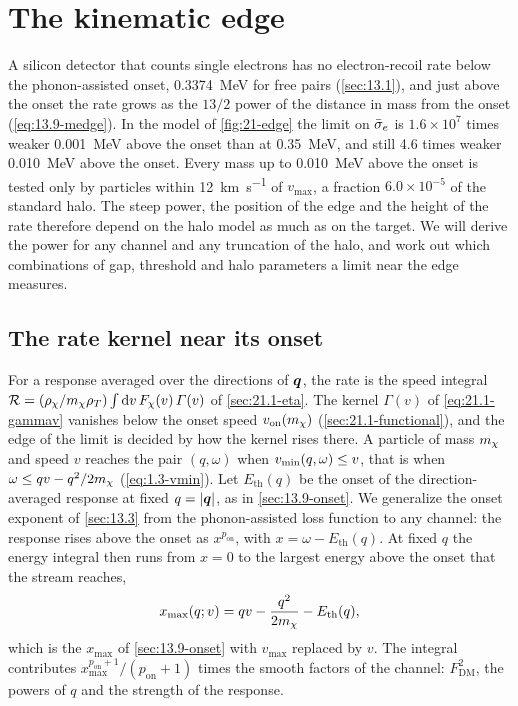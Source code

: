 \section{The kinematic edge}\label{sec:21.3}

A silicon detector that counts single electrons has no electron-recoil rate below the phonon-assisted onset, \SI{0.3374}{MeV} for free pairs (\cref{sec:13.1}), and just above the onset the rate grows as the $13/2$ power of the distance in mass from the onset (\cref{eq:13.9-medge}). In the model of \cref{fig:21-edge} the limit on $\bar{\sigma}_{e}$ is $1.6\times10^7$ times weaker \SI{0.001}{MeV} above the onset than at \SI{0.35}{MeV}, and still 4.6 times weaker \SI{0.010}{MeV} above the onset. Every mass up to \SI{0.010}{MeV} above the onset is tested only by particles within \SI{12}{km.s^{-1}} of $v_{\mathrm{max}}$, a fraction $6.0\times10^{-5}$ of the standard halo. The steep power, the position of the edge and the height of the rate therefore depend on the halo model as much as on the target. We will derive the power for any channel and any truncation of the halo, and work out which combinations of gap, threshold and halo parameters a limit near the edge measures.

\subsection{The rate kernel near its onset}\label{sec:21.3-kernel}

For a response averaged over the directions of $\bm{q}$, the rate is the speed integral $\mathcal{R} = (\rho_\chi/m_{\chi}\rho_T)\int\mathrm{d} v\, F_\chi(v)\,\varGamma(v)$ of \cref{sec:21.1-eta}. The kernel $\varGamma(v)$ of \cref{eq:21.1-gammav} vanishes below the onset speed $v_{\mathrm{on}}(m_{\chi})$ (\cref{sec:21.1-functional}), and the edge of the limit is decided by how the kernel rises there. A particle of mass $m_{\chi}$ and speed $v$ reaches the pair $(q,\omega)$ when $v_{\mathrm{min}}(q,\omega) \le v$, that is when $\omega \le qv - q^2/2m_{\chi}$ (\cref{eq:1.3-vmin}). Let $E_{\mathrm{th}}(q)$ be the onset of the direction-averaged response at fixed $q = |\bm{q}|$, as in \cref{sec:13.9-onset}. We generalize the onset exponent of \cref{sec:13.3} from the phonon-assisted loss function to any channel: the response rises above the onset as $x^{p_{\mathrm{on}}}$, with $x = \omega - E_{\mathrm{th}}(q)$. At fixed $q$ the energy integral then runs from $x = 0$ to the largest energy above the onset that the stream reaches,
\begin{equation*}
  x_{\mathrm{max}}(q; v) = qv - \frac{q^2}{2m_{\chi}} - E_{\mathrm{th}}(q) ,
\end{equation*}
which is the $x_{\mathrm{max}}$ of \cref{sec:13.9-onset} with $v_{\mathrm{max}}$ replaced by $v$. The integral contributes $x_{\mathrm{max}}^{p_{\mathrm{on}}+1}/(p_{\mathrm{on}}+1)$ times the smooth factors of the channel: $F_{\mathrm{DM}}^2$, the powers of $q$ and the strength of the response.

